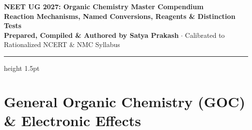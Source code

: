 \documentclass[10pt,a4paper]{article}
\begin{document}
\begin{center}
  {\Huge \textbf{NEET UG 2027: Organic Chemistry Master Compendium}}\\[6pt]
  {\Large \textbf{Reaction Mechanisms, Named Conversions, Reagents \& Distinction Tests}}\\[4pt]
  {\small \textbf{Prepared, Compiled \& Authored by Satya Prakash} $\cdot$ Calibrated to Rationalized NCERT \& NMC Syllabus}
  \vspace{4pt}
  \hrule height 1.5pt
\end{center}

\pagestyle{fancy}
\fancyhf{}
\fancyfoot[C]{\thepage}

\section{General Organic Chemistry (GOC) \& Electronic Effects}
\end{document}
